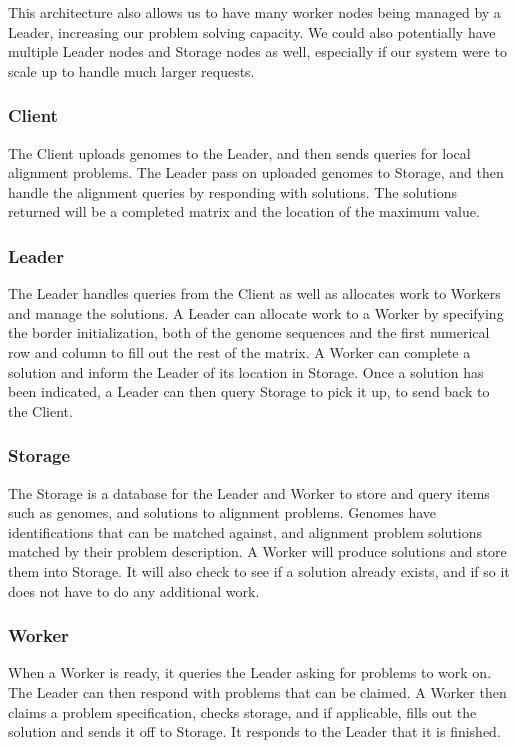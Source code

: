 \documentclass[11pt]{article}
\begin{document}
This architecture also allows us to have many worker nodes being managed by a Leader, increasing our problem solving capacity. 
We could also potentially have multiple Leader nodes and Storage nodes as well, especially if our system were to scale up to handle much larger requests.

\subsubsection{Client}
The Client uploads genomes to the Leader, and then sends queries for local alignment problems. The Leader pass on uploaded genomes to Storage, and then handle the alignment queries by responding with solutions. The solutions returned will be a completed matrix and the location of the maximum value.

\subsubsection{Leader}
The Leader handles queries from the Client as well as allocates work to Workers and manage the solutions. A Leader can allocate work to a Worker by specifying the border initialization, both of the genome sequences and the first numerical row and column to fill out the rest of the matrix. A Worker can complete a solution and inform the Leader of its location in Storage. Once a solution has been indicated, a Leader can then query Storage to pick it up, to send back to the Client. 

\subsubsection{Storage}
The Storage is a database for the Leader and Worker to store and query items such as genomes, and solutions to alignment problems. Genomes have identifications that can be matched against, and alignment problem solutions matched by their problem description. 
A Worker will produce solutions and store them into Storage. It will also check to see if a solution already exists, and if so it does not have to do any additional work.

\subsubsection{Worker}
When a Worker is ready, it queries the Leader asking for problems to work on. The Leader can then respond with problems that can be claimed. A Worker then claims a problem specification, checks storage, and if applicable, fills out the solution and sends it off to Storage. It responds to the Leader that it is finished.
\end{document}
